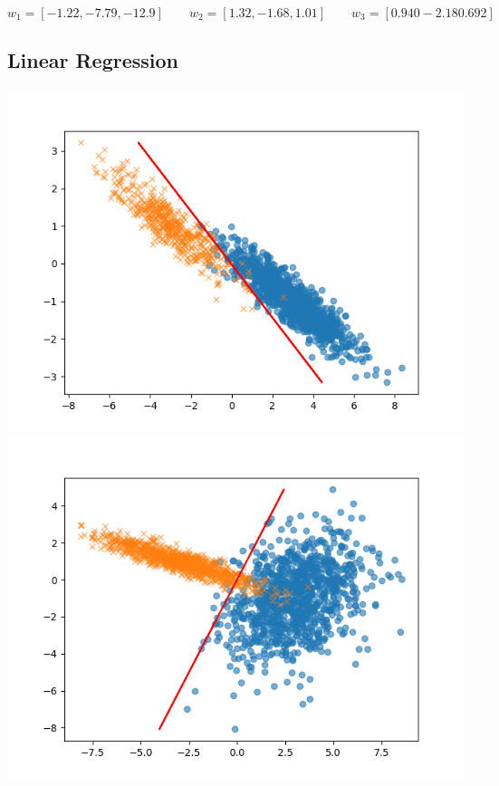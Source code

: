 \begin{equation}
  w_1 = [ -1.22, -7.79, -12.9] \qquad 
  w_2 = [ 1.32, -1.68, 1.01] \qquad
  w_3 = [ 0.940 -2.18  0.692]
\end{equation}
\clearpage
% 
\subsection{Linear Regression}
\includegraphics[height= 0.3\textheight]{LinearRegression0.png}
\includegraphics[height= 0.3\textheight]{LinearRegression1.png}
